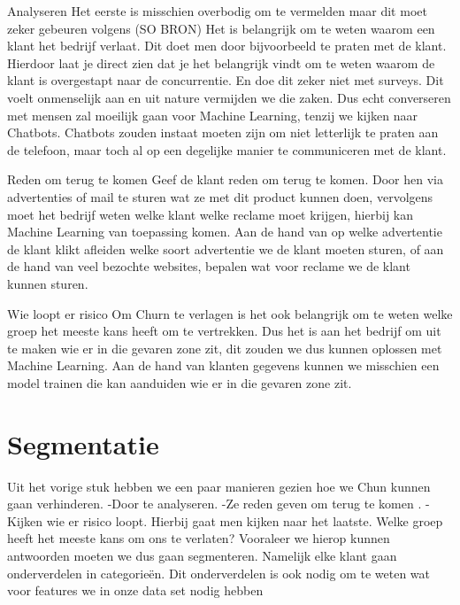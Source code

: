\begin{description}
	\item Analyseren \newline
	Het eerste is misschien overbodig om te vermelden maar dit moet zeker gebeuren volgens (SO BRON) Het is belangrijk om te weten waarom een klant het bedrijf verlaat. Dit doet men door bijvoorbeeld te praten met de klant. Hierdoor laat je direct zien dat je het belangrijk vindt om te weten waarom de klant is overgestapt naar de concurrentie. En doe dit zeker niet met surveys. Dit voelt onmenselijk aan en uit nature vermijden we die zaken. Dus echt converseren met mensen zal moeilijk gaan voor Machine Learning, tenzij we kijken naar Chatbots. Chatbots zouden instaat moeten zijn om niet letterlijk te praten aan de telefoon, maar toch al op een degelijke manier te communiceren met de klant.
	
	\item Reden om terug te komen \newline
	Geef de klant reden om terug te komen. Door hen via advertenties of mail te sturen wat ze met dit product kunnen doen, vervolgens moet het bedrijf weten welke klant welke reclame moet krijgen, hierbij kan Machine Learning van toepassing komen. Aan de hand van op welke advertentie de klant klikt afleiden welke soort advertentie we de klant moeten sturen, of aan de hand van veel bezochte websites, bepalen wat voor reclame we de klant kunnen sturen.
	\item Wie loopt er risico \newline
	 Om Churn te verlagen is het ook belangrijk om te weten welke groep het meeste kans heeft om te vertrekken. Dus het is aan het bedrijf om uit te maken wie er in die gevaren zone zit, dit zouden we dus kunnen oplossen met Machine Learning. Aan de hand van klanten gegevens kunnen we misschien een model trainen die kan aanduiden wie er in die gevaren zone zit.
\end{description}

\section{Segmentatie}
\label{sec:Segmentatie}
Uit het vorige stuk hebben we een paar manieren gezien hoe we Chun kunnen gaan verhinderen.\newline
-Door te analyseren.\newline
-Ze reden geven om terug te komen .\newline
-Kijken wie er risico loopt. \newline
Hierbij gaat men kijken naar het laatste. Welke groep heeft het meeste kans om ons te verlaten? Vooraleer we hierop kunnen antwoorden moeten we dus gaan segmenteren. Namelijk elke klant gaan onderverdelen in categorieën. Dit onderverdelen is ook nodig om te weten wat voor features we in onze data set nodig hebben

